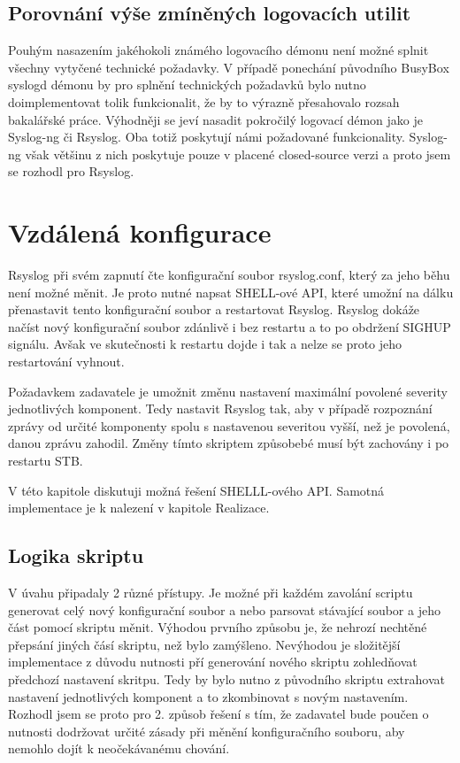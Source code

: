 \documentclass[thesis=B,czech]{FITthesis}[2012/06/26]
\begin{document}
\subsection{Porovnání výše zmíněných logovacích utilit}
Pouhým nasazením jakéhokoli známého logovacího démonu není možné splnit všechny vytyčené technické požadavky. V případě ponechání původního BusyBox syslogd démonu by pro splnění technických požadavků bylo nutno doimplementovat tolik funkcionalit, že by to výrazně přesahovalo rozsah bakalářské práce.
Výhodněji se jeví nasadit pokročilý logovací démon jako je Syslog-ng či Rsyslog. Oba totiž poskytují námi požadované funkcionality. Syslog-ng však většinu z nich poskytuje pouze v placené closed-source verzi a proto jsem se rozhodl pro Rsyslog.

\section{Vzdálená konfigurace}
Rsyslog při svém zapnutí čte konfigurační soubor rsyslog.conf, který za jeho běhu není možné měnit. Je proto nutné napsat SHELL-ové API, které umožní na dálku přenastavit tento konfigurační soubor a restartovat Rsyslog. Rsyslog dokáže načíst nový konfigurační soubor zdánlivě i bez restartu a to po obdržení SIGHUP signálu. Avšak ve skutečnosti \cite{RsyslogHUP} k restartu dojde i tak a nelze se proto jeho restartování vyhnout.

Požadavkem zadavatele je umožnit změnu nastavení maximální povolené severity jednotlivých komponent. Tedy nastavit Rsyslog tak, aby v případě rozpoznání zprávy od určité komponenty spolu s nastavenou severitou vyšší, než je povolená, danou zprávu zahodil. Změny tímto skriptem způsobebé musí být zachovány i po restartu STB.

V této kapitole diskutuji možná řešení SHELLL-ového API. Samotná implementace je k nalezení v kapitole Realizace.

\subsection{Logika skriptu}
V úvahu připadaly 2 různé přístupy. Je možné při každém zavolání scriptu generovat celý nový konfigurační soubor a nebo parsovat stávající soubor a jeho část pomocí skriptu měnit.
Výhodou prvního způsobu je, že nehrozí nechtěné přepsání jiných čásí skriptu, než bylo zamýšleno. Nevýhodou je složitější implementace z důvodu nutnosti pří generování nového skriptu zohledňovat předchozí nastavení skritpu. Tedy by bylo nutno z původního skriptu extrahovat nastavení jednotlivých komponent a to zkombinovat s novým nastavením.
Rozhodl jsem se proto pro 2. způsob řešení s tím, že zadavatel bude poučen o nutnosti dodržovat určité zásady při měnění konfiguračního souboru, aby nemohlo dojít k neočekávanému chování.
\end{document}

